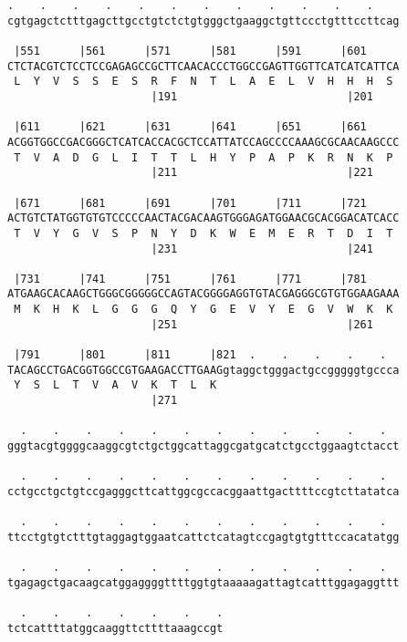 \documentclass{article}
\begin{document}
\begin{Verbatim}
.    .    .    .    .    .    .    .    .    .    .    .    
cgtgagctctttgagcttgcctgtctctgtgggctgaaggctgttccctgtttccttcag
                                                            
 |551      |561      |571      |581      |591      |601     
CTCTACGTCTCCTCCGAGAGCCGCTTCAACACCCTGGCCGAGTTGGTTCATCATCATTCA
 L  Y  V  S  S  E  S  R  F  N  T  L  A  E  L  V  H  H  H  S 
                      |191                          |201    
  
 |611      |621      |631      |641      |651      |661     
ACGGTGGCCGACGGGCTCATCACCACGCTCCATTATCCAGCCCCAAAGCGCAACAAGCCC
 T  V  A  D  G  L  I  T  T  L  H  Y  P  A  P  K  R  N  K  P 
                      |211                          |221    
  
 |671      |681      |691      |701      |711      |721     
ACTGTCTATGGTGTGTCCCCCAACTACGACAAGTGGGAGATGGAACGCACGGACATCACC
 T  V  Y  G  V  S  P  N  Y  D  K  W  E  M  E  R  T  D  I  T 
                      |231                          |241    
  
 |731      |741      |751      |761      |771      |781     
ATGAAGCACAAGCTGGGCGGGGGCCAGTACGGGGAGGTGTACGAGGGCGTGTGGAAGAAA
 M  K  H  K  L  G  G  G  Q  Y  G  E  V  Y  E  G  V  W  K  K 
                      |251                          |261    
  
 |791      |801      |811      |821  .    .    .    .    .  
TACAGCCTGACGGTGGCCGTGAAGACCTTGAAGgtaggctgggactgccgggggtgccca
 Y  S  L  T  V  A  V  K  T  L  K                            
                      |271                                  
  
  .    .    .    .    .    .    .    .    .    .    .    .  
gggtacgtggggcaaggcgtctgctggcattaggcgatgcatctgcctggaagtctacct
                                                            
  .    .    .    .    .    .    .    .    .    .    .    .  
cctgcctgctgtccgagggcttcattggcgccacggaattgacttttccgtcttatatca
                                                            
  .    .    .    .    .    .    .    .    .    .    .    .  
ttcctgtgtctttgtaggagtggaatcattctcatagtccgagtgtgtttccacatatgg
                                                            
  .    .    .    .    .    .    .    .    .    .    .    .  
tgagagctgacaagcatggaggggttttggtgtaaaaagattagtcatttggagaggttt
                                                            
  .    .    .    .    .    .    .
tctcattttatggcaaggttcttttaaagccgt
                                 

\end{Verbatim}
\end{document}
